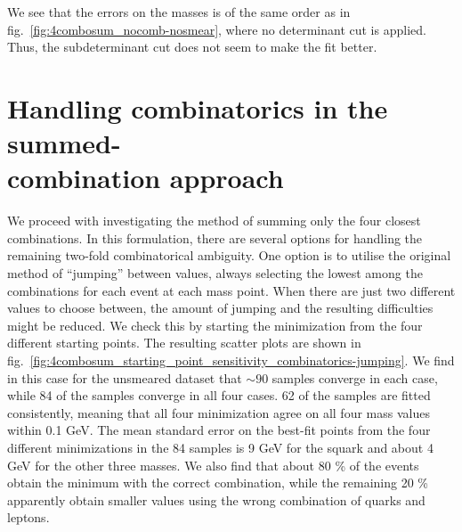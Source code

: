 \documentclass[twoside,english]{uiofysmaster}
\begin{document}
 We see that the errors on the masses is of the same order as in fig.\ \ref{fig:4combosum_nocomb-nosmear}, where no determinant cut is applied. Thus, the subdeterminant cut does not seem to make the fit better.


\section[Handling combinatorics in the summed-combination approach]{Handling combinatorics in the summed-\\combination approach}
\label{sec:handling_combinatorics_summed-combo}
We proceed with investigating the method of summing only the four closest combinations. In this formulation, there are several options for handling the remaining two-fold combinatorical ambiguity. One option is to utilise the original method of ``jumping'' between values, always selecting the lowest among the combinations for each event at each mass point. When there are just two different values to choose between, the amount of jumping and the resulting difficulties might be reduced. We check this by starting the minimization from the four different starting points. The resulting scatter plots are shown in fig.\ \ref{fig:4combosum_starting_point_sensitivity_combinatorics-jumping}. We find in this case for the unsmeared dataset that $\sim 90$ samples converge in each case, while 84 of the samples converge in all four cases. 62 of the samples are fitted consistently, meaning that all four minimization agree on all four mass values within 0.1 GeV. The mean standard error on the best-fit points from the four different minimizations in the 84 samples is 9 GeV for the squark and about 4 GeV for the other three masses. We also find that about 80 \% of the events obtain the minimum with the correct combination, while the remaining 20 \% apparently obtain smaller values using the wrong combination of quarks and leptons.
\end{document}
